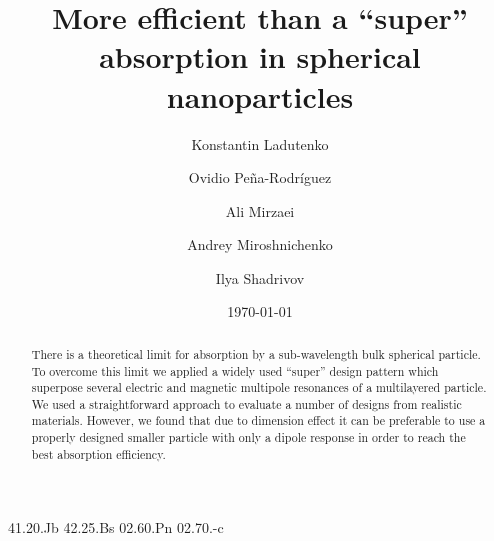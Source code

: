 \documentclass[aps,prl,twocolumn,showpacs,superscriptaddress,groupedaddress]{revtex4-1}
\begin{document}

\title{More efficient than a ``super'' absorption in spherical nanoparticles}


\author{Konstantin Ladutenko} 


\author{Ovidio Pe\~{n}a-Rodr\'{i}guez} 


\author{Ali Mirzaei} 
\author{Andrey Miroshnichenko}
\author{Ilya Shadrivov}

\date{\today}

\begin{abstract}
  There is a theoretical limit for absorption by a sub-wavelength bulk
  spherical particle.  To overcome this limit we applied a widely used
  ``super'' design pattern which superpose several electric and
  magnetic multipole resonances of a multilayered particle.  We used a
  straightforward approach to evaluate a number of designs from realistic
  materials.  However, we found that due to dimension effect it can be
  preferable to use a properly designed smaller particle with only a
  dipole response in order to reach the best absorption efficiency.
\end{abstract}


\pacs%
{41.20.Jb 42.25.Bs 02.60.Pn 02.70.-c}
\end{document}
